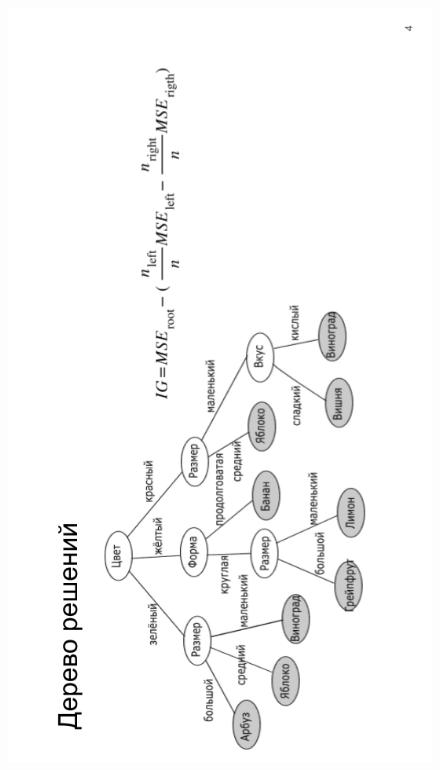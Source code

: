 \begin{figure}[H]
	\begin{center}
		\includegraphics[scale=0.7]{inc/img/slide4.png}
	\end{center}
\end{figure}
